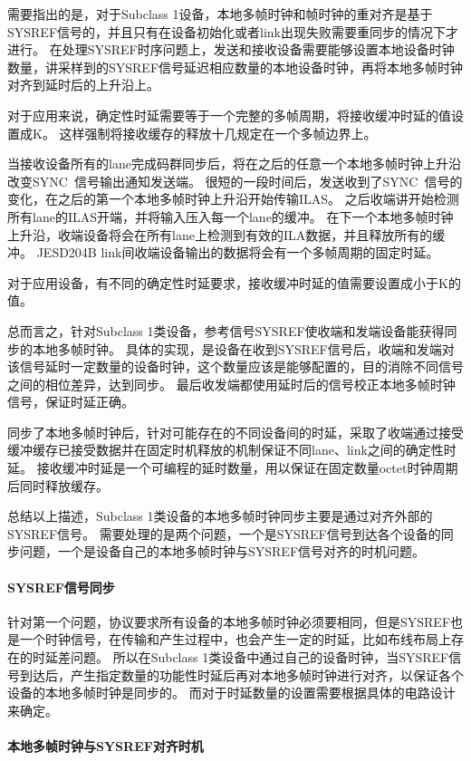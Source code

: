 \documentclass[UTF8]{ctexart}
\begin{document}
需要指出的是，对于Subclass 1设备，本地多帧时钟和帧时钟的重对齐是基于SYSREF信号的，并且只有在设备初始化或者link出现失败需要重同步的情况下才进行。
在处理SYSREF时序问题上，发送和接收设备需要能够设置本地设备时钟数量，讲采样到的SYSREF信号延迟相应数量的本地设备时钟，再将本地多帧时钟对齐到延时后的上升沿上。

对于应用来说，确定性时延需要等于一个完整的多帧周期，将接收缓冲时延的值设置成K。
这样强制将接收缓存的释放十几规定在一个多帧边界上。

当接收设备所有的lane完成码群同步后，将在之后的任意一个本地多帧时钟上升沿改变SYNC~信号输出通知发送端。
很短的一段时间后，发送收到了SYNC~信号的变化，在之后的第一个本地多帧时钟上升沿开始传输ILAS。
之后收端讲开始检测所有lane的ILAS开端，并将输入压入每一个lane的缓冲。
在下一个本地多帧时钟上升沿，收端设备将会在所有lane上检测到有效的ILA数据，并且释放所有的缓冲。
JESD204B link间收端设备输出的数据将会有一个多帧周期的固定时延。

对于应用设备，有不同的确定性时延要求，接收缓冲时延的值需要设置成小于K的值。

总而言之，针对Subclass 1类设备，参考信号SYSREF使收端和发端设备能获得同步的本地多帧时钟。
具体的实现，是设备在收到SYSREF信号后，收端和发端对该信号延时一定数量的设备时钟，这个数量应该是能够配置的，目的消除不同信号之间的相位差异，达到同步。
最后收发端都使用延时后的信号校正本地多帧时钟信号，保证时延正确。

同步了本地多帧时钟后，针对可能存在的不同设备间的时延，采取了收端通过接受缓冲缓存已接受数据并在固定时机释放的机制保证不同lane、link之间的确定性时延。
接收缓冲时延是一个可编程的延时数量，用以保证在固定数量octet时钟周期后同时释放缓存。

总结以上描述，Subclass 1类设备的本地多帧时钟同步主要是通过对齐外部的SYSREF信号。
需要处理的是两个问题，一个是SYSREF信号到达各个设备的同步问题，一个是设备自己的本地多帧时钟与SYSREF信号对齐的时机问题。

\paragraph{SYSREF信号同步}

针对第一个问题，协议要求所有设备的本地多帧时钟必须要相同，但是SYSREF也是一个时钟信号，在传输和产生过程中，也会产生一定的时延，比如布线布局上存在的时延差问题。
所以在Subclass 1类设备中通过自己的设备时钟，当SYSREF信号到达后，产生指定数量的功能性时延后再对本地多帧时钟进行对齐，以保证各个设备的本地多帧时钟是同步的。
而对于时延数量的设置需要根据具体的电路设计来确定。

\paragraph{本地多帧时钟与SYSREF对齐时机}
\end{document}
